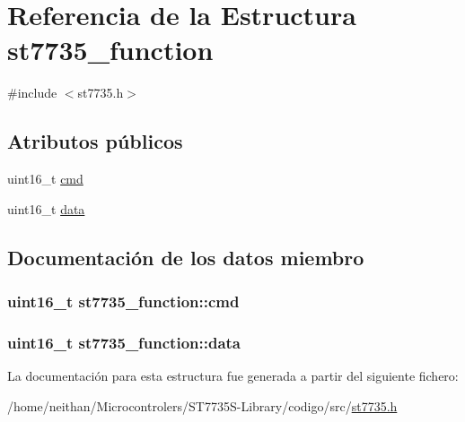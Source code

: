 \hypertarget{structst7735__function}{}\section{Referencia de la Estructura st7735\+\_\+function}
\label{structst7735__function}


{\ttfamily \#include $<$st7735.\+h$>$}

\subsection*{Atributos públicos}
\begin{DoxyCompactItemize}
\item 
uint16\+\_\+t \hyperlink{structst7735__function_a03ff5a54a8bc94c518065cb0cc46b216}{cmd}
\item 
uint16\+\_\+t \hyperlink{structst7735__function_a4580ffb7dd0866a1a3d8684b6f1a670f}{data}
\end{DoxyCompactItemize}


\subsection{Documentación de los datos miembro}
\subsubsection[{\texorpdfstring{cmd}{cmd}}]{\setlength{\rightskip}{0pt plus 5cm}uint16\+\_\+t st7735\+\_\+function\+::cmd}\hypertarget{structst7735__function_a03ff5a54a8bc94c518065cb0cc46b216}{}\label{structst7735__function_a03ff5a54a8bc94c518065cb0cc46b216}
\subsubsection[{\texorpdfstring{data}{data}}]{\setlength{\rightskip}{0pt plus 5cm}uint16\+\_\+t st7735\+\_\+function\+::data}\hypertarget{structst7735__function_a4580ffb7dd0866a1a3d8684b6f1a670f}{}\label{structst7735__function_a4580ffb7dd0866a1a3d8684b6f1a670f}


La documentación para esta estructura fue generada a partir del siguiente fichero\+:\begin{DoxyCompactItemize}
\item 
/home/neithan/\+Microcontrolers/\+S\+T7735\+S-\/\+Library/codigo/src/\hyperlink{st7735_8h}{st7735.\+h}\end{DoxyCompactItemize}

